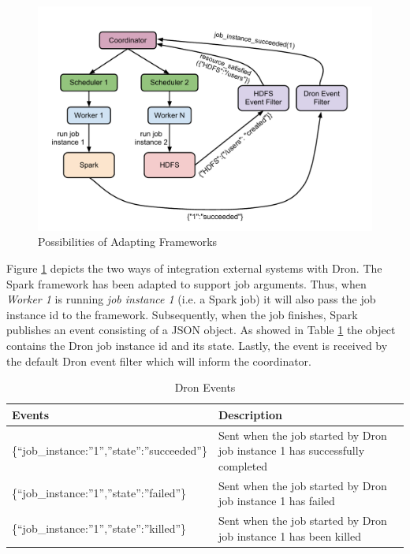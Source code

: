 \documentclass[11pt,a4paper,twoside]{report}
\begin{document}
\begin{figure}[h]
\centering
\includegraphics[scale=0.75]{AdaptFramework}
\caption{Possibilities of Adapting Frameworks}
\label{fig:AdaptFramework}
\end{figure}


Figure \ref{fig:AdaptFramework} depicts the two ways of integration external systems with Dron. The Spark framework has been adapted to support job arguments. Thus, when \textit{Worker 1} is running \textit{job instance 1} (i.e. a Spark job) it will also pass the job instance id to the framework. Subsequently, when the job finishes, Spark publishes an event consisting of a JSON object. As showed in Table \ref{tab:DronEvents} the object contains the Dron job instance id and its state. Lastly, the event is received by the default Dron event filter which will inform the coordinator.


\begin{table}[h]
\centering
\begin{tabular}{|l|p{5.9cm}|}
\hline
\textbf{Events} & \textbf{Description} \\ \hline
\{``job\_instance:''1'',''state'':''succeeded''\} &
Sent when the job started by Dron job instance 1 has successfully
completed\\ \hline

\{``job\_instance:''1'',''state'':''failed''\} &
Sent when the job started by Dron job instance 1 has failed \\ \hline

\{``job\_instance:''1'',''state'':''killed''\} &
Sent when the job started by Dron job instance 1 has been killed \\ \hline
\end{tabular}
\caption{Dron Events}
\label{tab:DronEvents}
\end{table}
\end{document}
